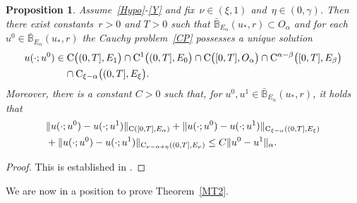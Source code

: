 \documentclass[reqno,11pt]{amsart}
\numberwithin{equation}{section}
\newtheorem{prop}[thm]{Proposition}
\theoremstyle{remark}
\begin{document}
\begin{prop}\label{FF}
Assume~\eqref{Hypo}-\eqref{Y} and fix~$\nu\in(\xi,1)$ and~${\eta\in(0,\gamma)}$.
Then there exist constants~$r>0$ and $T>0$  such that $\bar{\mathbb{B}}_{E_\alpha}(u_*,r)\subset O_\alpha$ and  
for each $u^0\in\bar{\mathbb{B}}_{E_\alpha}(u_*,r)$  the Cauchy problem~\eqref{CP}  possesses a unique solution
\begin{equation*}
\begin{aligned}
u(\cdot;u^0)&\in  {\rm C}\big((0,T],E_1\big)\cap{\rm C}^1\big((0,T],E_0\big)\cap {\rm C}\big([0,T],O_\alpha\big)
 \cap  {\rm C}^{\alpha-\beta}\big([0,T],E_\beta\big)\\
 &\quad\cap {\rm C}_{\xi-\alpha}\big((0,T],E_\xi\big).
\end{aligned}
\end{equation*}
Moreover, there is a constant $C>0$ such that, for $u^0, u^1\in \bar{\mathbb{B}}_{E_\alpha }(u_*,r)$, it holds that
\begin{equation}\label{F1}
\begin{aligned}
&\|u(\cdot;u^0)-u(\cdot;  u^1)\|_{{\rm C}([0,T],E_\alpha)} + \|u(\cdot;u^0)-u(\cdot;  u^1)\|_{{\rm C}_{\xi-\alpha}((0,T],E_\xi)}\\
&+ \|u(\cdot;u^0)-u(\cdot;  u^1)\|_{{\rm C}_{\nu-\alpha+\eta}((0,T],E_\nu)}
 \leq  C\|u^0- u^1\|_\alpha.
\end{aligned}
\end{equation}
\end{prop}
\begin{proof}
This is established in \cite[Proposition 2.1 and Corollary 2.2]{MSW25}.
\end{proof}

We are now in a position to prove Theorem~\ref{MT2}.
\end{document}

